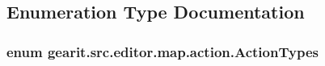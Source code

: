 \subsection{Enumeration Type Documentation}
\hypertarget{namespacegearit_1_1src_1_1editor_1_1map_1_1action_af036712a7d960b13d1e31954e65c00e3}{
\subsubsection[{Action\+Types}]{\setlength{\rightskip}{0pt plus 5cm}enum {\bf gearit.\+src.\+editor.\+map.\+action.\+Action\+Types}}}\label{namespacegearit_1_1src_1_1editor_1_1map_1_1action_af036712a7d960b13d1e31954e65c00e3}
